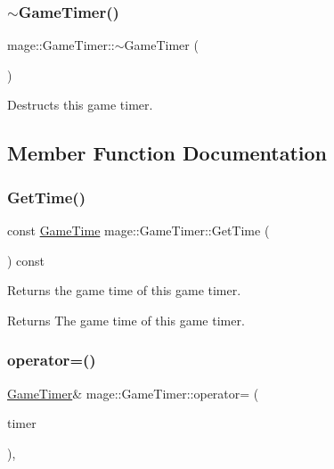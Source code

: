 \subsubsection{\texorpdfstring{$\sim$\+Game\+Timer()}{~GameTimer()}}
{\footnotesize\ttfamily mage\+::\+Game\+Timer\+::$\sim$\+Game\+Timer (\begin{DoxyParamCaption}{ }\end{DoxyParamCaption})\hspace{0.3cm}{\ttfamily [default]}}

Destructs this game timer. 

\subsection{Member Function Documentation}
\mbox{\label{classmage_1_1_game_timer_a5883ab785122b5722ec11045e146ff18}} 
\subsubsection{\texorpdfstring{Get\+Time()}{GetTime()}}
{\footnotesize\ttfamily const \mbox{\hyperlink{classmage_1_1_game_time}{Game\+Time}} mage\+::\+Game\+Timer\+::\+Get\+Time (\begin{DoxyParamCaption}{ }\end{DoxyParamCaption}) const\hspace{0.3cm}{\ttfamily [noexcept]}}

Returns the game time of this game timer.

\begin{DoxyReturn}{Returns}
The game time of this game timer. 
\end{DoxyReturn}
\mbox{\label{classmage_1_1_game_timer_a9465e2d38d8810c2acb2cde2aafeaad1}} 
\subsubsection{\texorpdfstring{operator=()}{operator=()}\hspace{0.1cm}{\footnotesize\ttfamily [1/2]}}
{\footnotesize\ttfamily \mbox{\hyperlink{classmage_1_1_game_timer}{Game\+Timer}}\& mage\+::\+Game\+Timer\+::operator= (\begin{DoxyParamCaption}\item[{const \mbox{\hyperlink{classmage_1_1_game_timer}{Game\+Timer}} \&}]{timer }\end{DoxyParamCaption})\hspace{0.3cm}{\ttfamily [default]}, {\ttfamily [noexcept]}}

